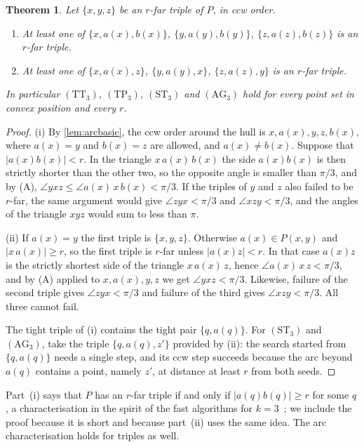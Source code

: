 \documentclass[11pt,a4paper]{article}
\newtheorem{theorem}{Theorem}
\theoremstyle{definition}
\theoremstyle{remark}
\newcommand{\ang}{\angle}
\begin{document}
\begin{theorem}\label{thm:k3}
Let $\{x,y,z\}$ be an $r$-far triple of $P$, in ccw order.
\begin{enumerate}[label=(\roman*),itemsep=1pt,topsep=2pt]
\item At least one of $\{x,a(x),b(x)\}$, $\{y,a(y),b(y)\}$,
$\{z,a(z),b(z)\}$ is an $r$-far triple.
\item At least one of $\{x,a(x),z\}$, $\{y,a(y),x\}$, $\{z,a(z),y\}$ is an
$r$-far triple.
\end{enumerate}
In particular $(\mathrm{TT}_3)$, $(\mathrm{TP}_3)$, $(\mathrm{ST}_3)$ and
$(\mathrm{AG}_3)$ hold for every point set in convex position and every $r$.
\end{theorem}
\begin{proof}
(i) By \cref{lem:arcbasic}, the ccw order around the hull is
$x,a(x),y,z,b(x)$, where $a(x)=y$ and $b(x)=z$ are allowed, and
$a(x)\ne b(x)$. Suppose that $|a(x)b(x)|<r$. In the triangle $x\,a(x)\,b(x)$
the side $a(x)b(x)$ is then strictly shorter than the other two, so the
opposite angle is smaller than $\pi/3$, and by (A),
$\ang yxz\le\ang a(x)\,x\,b(x)<\pi/3$. If the triples of $y$ and $z$ also
failed to be $r$-far, the same argument would give $\ang zyx<\pi/3$ and
$\ang xzy<\pi/3$, and the angles of the triangle $xyz$ would sum to less than
$\pi$.

(ii) If $a(x)=y$ the first triple is $\{x,y,z\}$. Otherwise $a(x)\in P(x,y)$
and $|x\,a(x)|\ge r$, so the first triple is $r$-far unless $|a(x)z|<r$. In
that case $a(x)z$ is the strictly shortest side of the triangle $x\,a(x)\,z$,
hence $\ang a(x)\,x\,z<\pi/3$, and by (A) applied to $x,a(x),y,z$ we get
$\ang yxz<\pi/3$. Likewise, failure of the second triple gives
$\ang zyx<\pi/3$ and failure of the third gives $\ang xzy<\pi/3$. All three
cannot fail.

The tight triple of (i) contains the tight pair $\{q,a(q)\}$. For
$(\mathrm{ST}_3)$ and $(\mathrm{AG}_3)$, take the triple $\{q,a(q),z'\}$
provided by (ii): the search started from $\{q,a(q)\}$ needs a single step,
and its ccw step succeeds because the arc beyond $a(q)$ contains a point,
namely $z'$, at distance at least $r$ from both seeds.
\end{proof}

Part~(i) says that $P$ has an $r$-far triple if and only if
$|a(q)b(q)|\ge r$ for some $q$, a characterisation in the spirit of the
fast algorithms for $k=3$~\cite{kobayashi,tw25}; we include the proof
because it is short and because part~(ii) uses the same idea. The arc
characterisation holds for triples as well.
\end{document}
